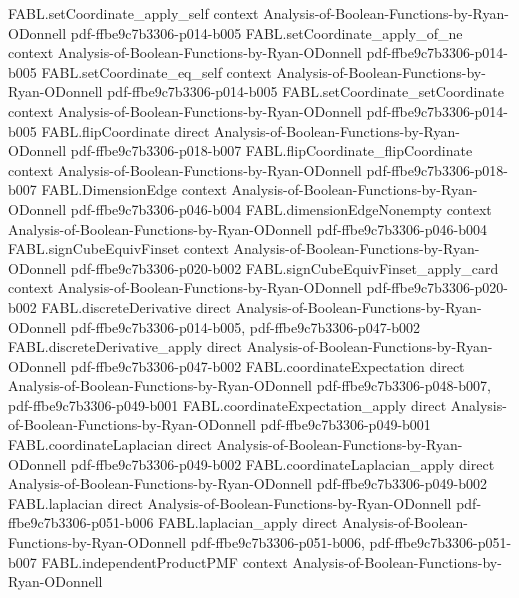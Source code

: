 \begin{theorem}
\proofstep
  {FABL.setCoordinate_apply_self}
  {context}
  {Analysis-of-Boolean-Functions-by-Ryan-ODonnell}
  {pdf-ffbe9c7b3306-p014-b005}
\proofstep
  {FABL.setCoordinate_apply_of_ne}
  {context}
  {Analysis-of-Boolean-Functions-by-Ryan-ODonnell}
  {pdf-ffbe9c7b3306-p014-b005}
\proofstep
  {FABL.setCoordinate_eq_self}
  {context}
  {Analysis-of-Boolean-Functions-by-Ryan-ODonnell}
  {pdf-ffbe9c7b3306-p014-b005}
\proofstep
  {FABL.setCoordinate_setCoordinate}
  {context}
  {Analysis-of-Boolean-Functions-by-Ryan-ODonnell}
  {pdf-ffbe9c7b3306-p014-b005}
\proofstep
  {FABL.flipCoordinate}
  {direct}
  {Analysis-of-Boolean-Functions-by-Ryan-ODonnell}
  {pdf-ffbe9c7b3306-p018-b007}
\proofstep
  {FABL.flipCoordinate_flipCoordinate}
  {context}
  {Analysis-of-Boolean-Functions-by-Ryan-ODonnell}
  {pdf-ffbe9c7b3306-p018-b007}
\proofstep
  {FABL.DimensionEdge}
  {context}
  {Analysis-of-Boolean-Functions-by-Ryan-ODonnell}
  {pdf-ffbe9c7b3306-p046-b004}
\proofstep
  {FABL.dimensionEdgeNonempty}
  {context}
  {Analysis-of-Boolean-Functions-by-Ryan-ODonnell}
  {pdf-ffbe9c7b3306-p046-b004}
\proofstep
  {FABL.signCubeEquivFinset}
  {context}
  {Analysis-of-Boolean-Functions-by-Ryan-ODonnell}
  {pdf-ffbe9c7b3306-p020-b002}
\proofstep
  {FABL.signCubeEquivFinset_apply_card}
  {context}
  {Analysis-of-Boolean-Functions-by-Ryan-ODonnell}
  {pdf-ffbe9c7b3306-p020-b002}
\proofstep
  {FABL.discreteDerivative}
  {direct}
  {Analysis-of-Boolean-Functions-by-Ryan-ODonnell}
  {pdf-ffbe9c7b3306-p014-b005,
    pdf-ffbe9c7b3306-p047-b002}
\proofstep
  {FABL.discreteDerivative_apply}
  {direct}
  {Analysis-of-Boolean-Functions-by-Ryan-ODonnell}
  {pdf-ffbe9c7b3306-p047-b002}
\proofstep
  {FABL.coordinateExpectation}
  {direct}
  {Analysis-of-Boolean-Functions-by-Ryan-ODonnell}
  {pdf-ffbe9c7b3306-p048-b007,
    pdf-ffbe9c7b3306-p049-b001}
\proofstep
  {FABL.coordinateExpectation_apply}
  {direct}
  {Analysis-of-Boolean-Functions-by-Ryan-ODonnell}
  {pdf-ffbe9c7b3306-p049-b001}
\proofstep
  {FABL.coordinateLaplacian}
  {direct}
  {Analysis-of-Boolean-Functions-by-Ryan-ODonnell}
  {pdf-ffbe9c7b3306-p049-b002}
\proofstep
  {FABL.coordinateLaplacian_apply}
  {direct}
  {Analysis-of-Boolean-Functions-by-Ryan-ODonnell}
  {pdf-ffbe9c7b3306-p049-b002}
\proofstep
  {FABL.laplacian}
  {direct}
  {Analysis-of-Boolean-Functions-by-Ryan-ODonnell}
  {pdf-ffbe9c7b3306-p051-b006}
\proofstep
  {FABL.laplacian_apply}
  {direct}
  {Analysis-of-Boolean-Functions-by-Ryan-ODonnell}
  {pdf-ffbe9c7b3306-p051-b006,
    pdf-ffbe9c7b3306-p051-b007}
\proofstep
  {FABL.independentProductPMF}
  {context}
  {Analysis-of-Boolean-Functions-by-Ryan-ODonnell}

\end{theorem}
